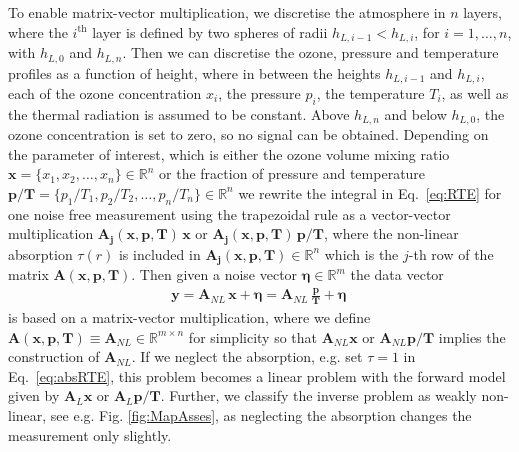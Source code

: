 To enable matrix-vector multiplication, we discretise the atmosphere in $n$ layers, where the $i^\text{th}$ layer is defined by two spheres of radii $h_{L,i-1} < h_{L,i}$, for $i = 1, \dots, n$, with $h_{L,0}$ and $h_{L,n} $.
Then we can discretise the ozone, pressure and temperature profiles as a function of height, where in between the heights $h_{L,i-1}$ and $h_{L,i}$, each of the ozone concentration $x_{i}$, the pressure $p_{i}$, the temperature $T_{i}$, as well as the thermal radiation is assumed to be constant.
Above $h_{L, n}$ and below $h_{L,0} $, the ozone concentration is set to zero, so no signal can be obtained.
Depending on the parameter of interest, which is either the ozone volume mixing ratio $\bm{x} =\{x_1,x_2,\ldots,x_n\} \in \mathbb{R}^{n}$ or the fraction of pressure and temperature $\bm{p/T}= \{p_1/T_1,p_2/T_2,\ldots,p_n/T_n\} \in \mathbb{R}^{n} $
we rewrite the integral in Eq.~\eqref{eq:RTE} for one noise free measurement using the trapezoidal rule as a vector-vector multiplication $\bm{A_{j}}(\bm{x},  \bm{p},\bm{T}) \, \bm{x} $ or $\bm{A_{j}}(\bm{x},  \bm{p},\bm{T}) \, \bm{p}/ \bm{T} $, where the non-linear absorption $\tau(r)$ is included in $\bm{A_{j}}(\bm{x},  \bm{p},\bm{T}) \in \mathbb{R}^{n}$ which is the $j$-th row of the matrix $\bm{A}(\bm{x},  \bm{p},\bm{T})$.
Then given a noise vector $\bm{\eta} \in \mathbb{R}^{m}$ the data vector
\begin{align}
	\bm{y} = \bm{A}_{NL} \, \bm{x} + \bm{\eta}= \bm{A}_{NL} \,
	\frac{ \bm{p}}{\bm{T}} + \bm{\eta} \, 
\end{align}
is based on a matrix-vector multiplication, where we define $\bm{A}(\bm{x},  \bm{p},\bm{T}) \equiv \bm{A}_{NL} \in \mathbb{R}^{m \times n}$ for simplicity so that $\bm{A}_{NL}\bm{x}$ or $\bm{A}_{NL}\bm{p}/\bm{T}$ implies the construction of $\bm{A}_{NL}$.
If we neglect the absorption, e.g. set $\tau = 1$ in Eq.~\eqref{eq:absRTE}, this problem becomes a linear problem with the forward model given by $\bm{A}_{L}\bm{x}$ or $\bm{A}_{L}\bm{p}/\bm{T}$. 
Further, we classify the inverse problem as weakly non-linear, see e.g. Fig. \ref{fig:MapAsses}, as neglecting the absorption changes the measurement only slightly.

